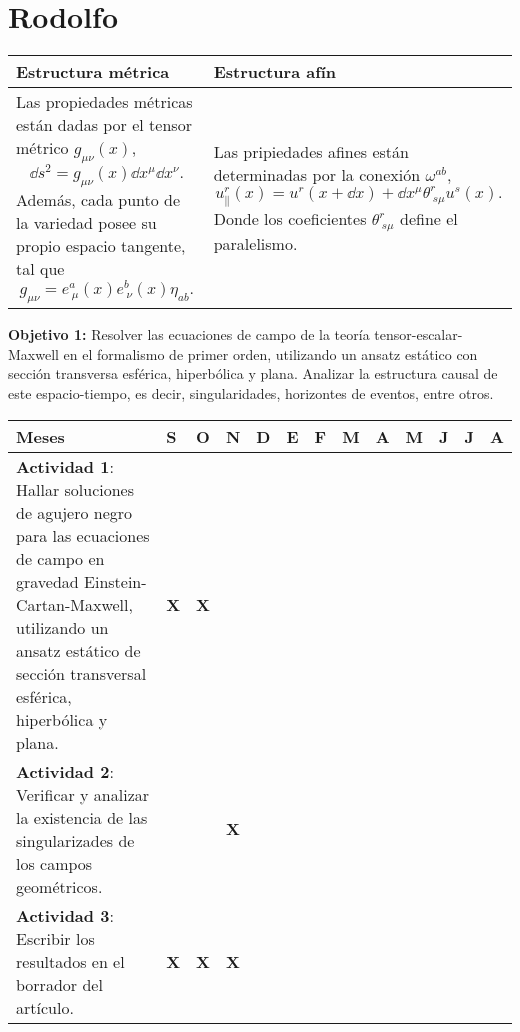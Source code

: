 \section{Rodolfo}
\begin{center}
\begin{tabular}{ |p{7cm} | p{7cm}|} 
 \hline
 \textbf{Estructura métrica} & \textbf{Estructura afín} \\  \hline \hline
 Las propiedades métricas están dadas por el tensor métrico $g_{\mu\nu}(x)$,  $$\dd s^2=g_{\mu\nu }(x)\dd x^\mu \dd x^\nu .$$ Además, cada punto de la variedad posee su propio espacio tangente, tal que $$g_{\mu\nu }=e^{a}_{~\mu }(x)e^{b}_{~\nu }(x)\eta_{a b}.$$ & Las pripiedades afines están determinadas por la conexión $\omega^{ab},$ $$u^r_\parallel (x)=u^r(x+\dd x)+\dd x^\mu \theta ^r _{~s\mu }u^s(x).$$ Donde los coeficientes $\theta ^r _{~s\mu }$ define el paralelismo. \\
 \hline
\end{tabular}
\end{center}

\textbf{Objetivo 1:} Resolver las ecuaciones de campo de la teoría tensor-escalar-Maxwell en el formalismo de primer orden, utilizando un ansatz estático con sección transversa esférica, hiperbólica y plana. Analizar la estructura causal de este espacio-tiempo, es decir, singularidades, horizontes de eventos, entre otros.
\begin{center}
\begin{tabular}{|p{7cm} | p{0.2cm}|p{0.2cm}| p{0.2cm}| p{0.2cm}| p{0.2cm}| p{0.2cm}|p{0.2cm}| p{0.2cm}| p{0.2cm}|p{0.2cm}|p{0.2cm}|p{0.2cm}|} 
 \hline
 \textbf{Meses}&\textbf{S}&\textbf{O}&\textbf{N}&\textbf{D}&\textbf{E}&\textbf{F}&\textbf{M}&\textbf{A}&\textbf{M}&\textbf{J}&\textbf{J}&\textbf{A}\\ \hline
 \textbf{Actividad 1}: Hallar soluciones de agujero negro para las ecuaciones de campo en gravedad Einstein-Cartan-Maxwell, utilizando un ansatz estático de sección transversal esférica, hiperbólica y plana.&\textbf{X}&\textbf{X}&&&&&&&&&&\\ \hline
 \textbf{Actividad 2}: Verificar y analizar la existencia de las singularizades de los campos geométricos.&&&\textbf{X}&&&&&&&&&\\ \hline
\textbf{ Actividad 3}: Escribir los resultados en el borrador del artículo.&\textbf{X}&\textbf{X}&\textbf{X}&&&&&&&&&\\ \hline
\end{tabular}
\end{center}
 
